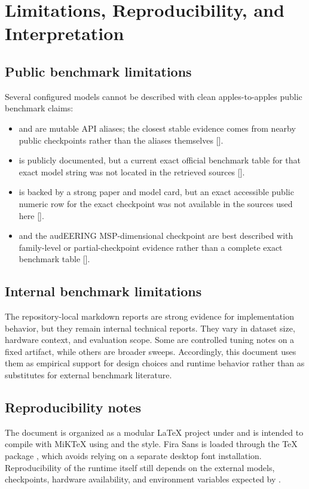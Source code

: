 \chapter{Limitations, Reproducibility, and Interpretation}

\section{Public benchmark limitations}

Several configured models cannot be described with clean apples-to-apples public benchmark claims:

\begin{itemize}
  \item {} and  are mutable API aliases; the closest stable evidence comes from nearby public checkpoints rather than the aliases themselves [\cite{deepseek_api_docs,deepseek_v32exp_modelcard}].
  \item {} is publicly documented, but a current exact official benchmark table for that exact model string was not located in the retrieved sources [\cite{google_gemini_api_models}].
  \item {} is backed by a strong paper and model card, but an exact accessible public numeric row for the exact checkpoint was not available in the sources used here [\cite{toolace8b_card,toolace_paper}].
  \item {} and the audEERING MSP-dimensional checkpoint are best described with family-level or partial-checkpoint evidence rather than a complete exact benchmark table [\cite{emotion2vec_plus_large_modelcard,emotion2vec_paper,audeering_modelcard,wagner2023ser}].
\end{itemize}

\section{Internal benchmark limitations}

The repository-local markdown reports are strong evidence for implementation behavior, but they remain internal technical reports. They vary in dataset size, hardware context, and evaluation scope. Some are controlled tuning notes on a fixed artifact, while others are broader sweeps. Accordingly, this document uses them as empirical support for design choices and runtime behavior rather than as substitutes for external benchmark literature.

\section{Reproducibility notes}

The document is organized as a modular LaTeX project under  and is intended to compile with MiKTeX using  and the   style. Fira Sans is loaded through the TeX package , which avoids relying on a separate desktop font installation. Reproducibility of the runtime itself still depends on the external models, checkpoints, hardware availability, and environment variables expected by .
